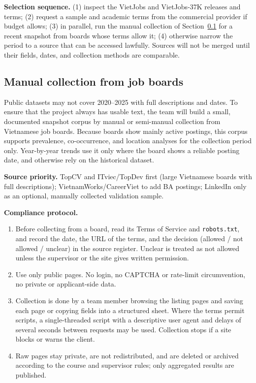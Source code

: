 \documentclass[12pt,a4paper]{article}
\begin{document}
\textbf{Selection sequence.} (1) inspect the VietJobs and VietJobs-37K
releases and terms; (2) request a sample and academic terms from the
commercial provider if budget allows; (3) in parallel, run the manual
collection of Section~\ref{sec:manual} for a recent snapshot from boards
whose terms allow it; (4) otherwise narrow the period to a source that can
be accessed lawfully. Sources will not be merged until their fields, dates,
and collection methods are comparable.

\subsection{Manual collection from job boards}\label{sec:manual}
Public datasets may not cover 2020--2025 with full descriptions and dates.
To ensure that the project always has usable text, the team will build a
small, documented snapshot corpus by manual or semi-manual collection from
Vietnamese job boards. Because boards show mainly active postings, this
corpus supports prevalence, co-occurrence, and location analyses for the
collection period only. Year-by-year trends use it only where the board
shows a reliable posting date, and otherwise rely on the historical dataset.

\textbf{Source priority.} TopCV and ITviec/TopDev first (large Vietnamese
boards with full descriptions); VietnamWorks/CareerViet to add BA
postings; LinkedIn only as an optional, manually collected validation
sample.

\textbf{Compliance protocol.}
\begin{enumerate}
  \item Before collecting from a board, read its Terms of Service and
        \texttt{robots.txt}, and record the date, the URL of the terms, and
        the decision (allowed / not allowed / unclear) in the source
        register. Unclear is treated as not allowed unless the supervisor
        or the site gives written permission.
  \item Use only public pages. No login, no CAPTCHA or rate-limit
        circumvention, no private or applicant-side data.
  \item Collection is done by a team member browsing the listing pages and
        saving each page or copying fields into a structured sheet. Where
        the terms permit scripts, a single-threaded script with a
        descriptive user agent and delays of several seconds between
        requests may be used. Collection stops if a site blocks or warns
        the client.
  \item Raw pages stay private, are not redistributed, and are deleted or
        archived according to the course and supervisor rules; only
        aggregated results are published.
\end{enumerate}
\end{document}
